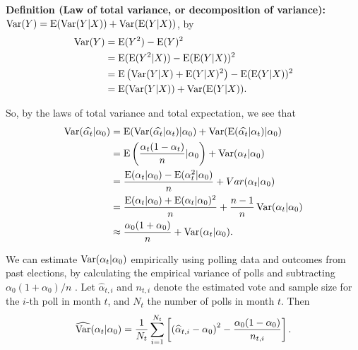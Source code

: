 \documentclass[thesis.tex]{subfiles}
\begin{document}
\bigskip

\noindent\textbf{Definition (Law of total variance, or decomposition of variance):} \(\operatorname{Var}(Y) = \operatorname{E}(\operatorname{Var}(Y | X)) + \operatorname{Var}(\operatorname{E}(Y | X))\), by \begin{equation}
\begin{aligned}
	\operatorname{Var}(Y) &= \operatorname{E}(Y^2) - \operatorname{E}(Y)^2 \\
	&= \operatorname{E}(\operatorname{E}(Y^2 | X)) - \operatorname{E}(\operatorname{E}(Y | X))^2 \\
	&= \operatorname{E}\left(\operatorname{Var}(Y|X) + \operatorname{E}(Y | X)^2\right) - \operatorname{E}(\operatorname{E}(Y | X))^2 \\
	&= \operatorname{E}(\operatorname{Var}(Y | X)) + \operatorname{Var}(\operatorname{E}(Y | X)).
\end{aligned}
\end{equation}

\bigskip
\bigskip

\noindent So, by the laws of total variance and total expectation, we see that \begin{equation}\begin{aligned}
	\operatorname{Var}(\widehat{\alpha_t} | \alpha_0)
	&= \operatorname{E}(\operatorname{Var}(\widehat{\alpha_t} | \alpha_t) | \alpha_0) + \operatorname{Var}(\operatorname{E}(\widehat{\alpha_t} | \alpha_t) | \alpha_0) \\
	&= \operatorname{E}\left(\frac{\alpha_t(1- \alpha_t)}{n} | \alpha_0\right) + \operatorname{Var}(\alpha_t | \alpha_0) \\
	&= \frac{\operatorname{E}(\alpha_t | \alpha_0) - \operatorname{E}(\alpha_t^2 | \alpha_0)}{n} + Var(\alpha_t | \alpha_0) \\
	&= \frac{\operatorname{E}(\alpha_t | \alpha_0) + \operatorname{E}(\alpha_t | \alpha_0)^2}{n} + \frac{n-1}{n}\operatorname{Var}(\alpha_t | \alpha_0) \\
	&\approx \frac{\alpha_0 (1 + \alpha_0)}{n} + \operatorname{Var}(\alpha_t | \alpha_0).
\end{aligned}
\end{equation}

We can estimate \(\operatorname{Var}(\alpha_t | \alpha_0)\) empirically using polling data and outcomes from past elections, by calculating the empirical variance of polls and subtracting \(\alpha_0 (1 + \alpha_0) / n\) . Let \(\widehat{\alpha}_{t, i}\) and \(n_{t, i}\) denote the estimated vote and sample size for the \(i\)-th poll in month \(t\), and \(N_t\) the number of polls in month \(t\). Then \begin{equation}
\begin{aligned}
\widehat{\operatorname{Var}}(\alpha_t | \alpha_0) = \frac{1}{N_t} \sum_{i=1}^{N_t}\left[ \left( \widehat{\alpha}_{t, i} - \alpha_0\right)^2 - \frac{\alpha_0 (1 - \alpha_0)}{n_{t,i}} \right].
\end{aligned}
\end{equation}
\end{document}
